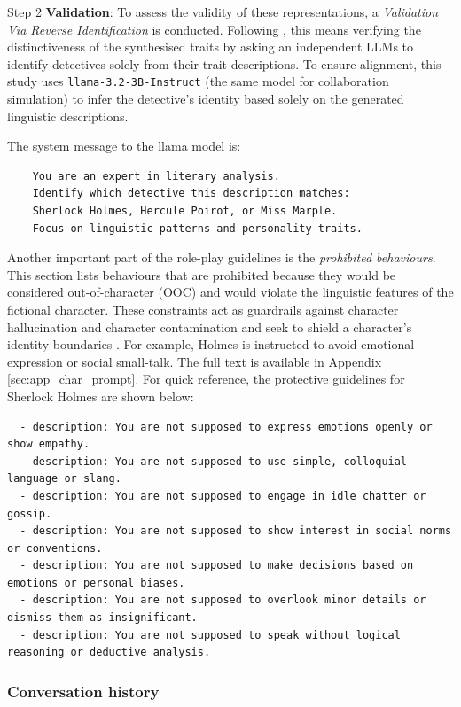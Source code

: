 \documentclass{article}
\begin{document}
Step 2 \textbf{Validation}: To assess the validity of these representations, a \textit{Validation Via Reverse Identification} is conducted. Following \citet{delima2025detective}, this means verifying the distinctiveness of the synthesised traits by asking an independent LLMs to identify detectives solely from their trait descriptions. To ensure alignment, this study uses \texttt{llama-3.2-3B-Instruct} (the same model for collaboration simulation) to infer the detective's identity based solely on the generated linguistic descriptions. 

The system message to the llama model is:
\begin{verbatim}
    You are an expert in literary analysis.
    Identify which detective this description matches: 
    Sherlock Holmes, Hercule Poirot, or Miss Marple.
    Focus on linguistic patterns and personality traits.
\end{verbatim}

Another important part of the role-play guidelines is the \emph{prohibited behaviours}. This section lists behaviours that are prohibited because they would be considered out-of-character (OOC) and would violate the linguistic features of the fictional character. These constraints act as guardrails against character hallucination and character contamination and seek to shield a character's identity boundaries \citep{shao2023characterllm}. For example, Holmes is instructed to avoid emotional expression or social small-talk. The full text is available in Appendix \ref{sec:app_char_prompt}. For quick reference, the protective guidelines for Sherlock Holmes are shown below:
\begin{verbatim}
  - description: You are not supposed to express emotions openly or show empathy.
  - description: You are not supposed to use simple, colloquial language or slang.
  - description: You are not supposed to engage in idle chatter or gossip.
  - description: You are not supposed to show interest in social norms or conventions.
  - description: You are not supposed to make decisions based on emotions or personal biases.
  - description: You are not supposed to overlook minor details or dismiss them as insignificant.
  - description: You are not supposed to speak without logical reasoning or deductive analysis.
\end{verbatim}

\subsubsection{Conversation history} \label{sec:methods_prompt_history}
\end{document}
